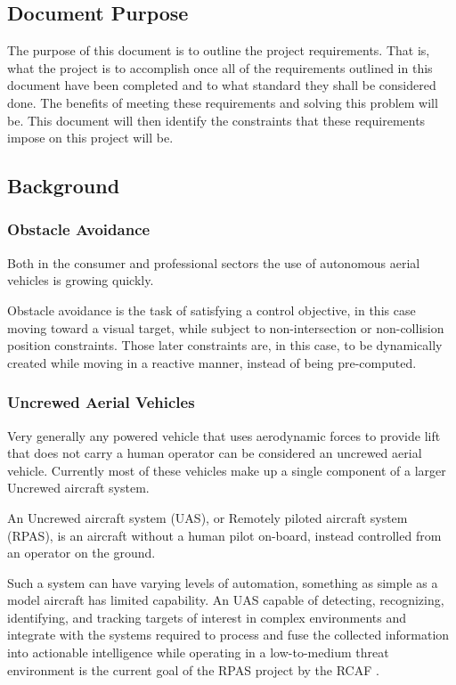 \documentclass{article}
\begin{document}
	\subsection{Document Purpose}
	
	The purpose of this document is to outline the project requirements. That is, what the project is to accomplish once all of the requirements outlined in this document have been completed and to what standard they shall be considered done. The benefits of meeting these requirements and solving this problem will be. This document will then identify the constraints that these requirements impose on this project will be.
	
	\subsection{Background}
	
		\subsubsection{Obstacle Avoidance}
		
		Both in the consumer and professional sectors the use of autonomous aerial vehicles is growing quickly. 
		
		Obstacle avoidance is the task of satisfying a control objective, in this case moving toward a visual target, while subject to non-intersection or non-collision position constraints. Those later constraints are, in this case, to be dynamically created while moving in a reactive manner, instead of being pre-computed.
		
		\subsubsection{Uncrewed Aerial Vehicles}
		
		Very generally any powered vehicle that uses aerodynamic forces to provide lift that does not carry a human operator can be considered an uncrewed aerial vehicle. Currently most of these vehicles make up a single component of a larger Uncrewed aircraft system. 
		
		An Uncrewed aircraft system (UAS), or Remotely piloted aircraft system (RPAS), is an aircraft without a human pilot on-board, instead controlled from an operator on the ground. 
		
		Such a system can have varying levels of automation, something as simple as a model aircraft has limited capability. An UAS capable of detecting, recognizing, identifying, and tracking targets of interest in complex environments and integrate with the systems required to process and fuse the collected information into actionable intelligence while operating in a low-to-medium threat environment is the current goal of the RPAS project by the RCAF \cite{RPAS}. 
		
\end{document}
